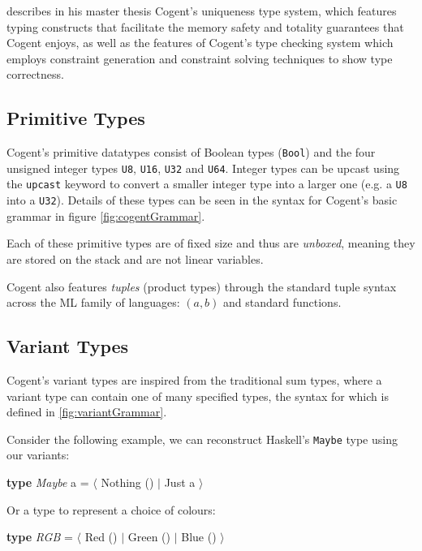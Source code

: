 \citet{LiamThesis} describes in his master thesis Cogent's uniqueness type
system, which features typing constructs that facilitate the memory safety
and totality guarantees that Cogent enjoys, as well as the features of
Cogent's type checking system which employs constraint generation
and constraint solving techniques to show type correctness.

\subsection{Primitive Types}

Cogent's primitive datatypes consist of Boolean types (\texttt{Bool}) and the four unsigned integer types \texttt{U8}, 
\texttt{U16}, \texttt{U32} and \texttt{U64}. Integer types can be upcast using the \texttt{\textsf{upcast}}
keyword to convert a smaller integer type into a larger one (e.g. a \texttt{U8} into a \texttt{U32}).
Details of these types can be seen in the syntax for Cogent's basic grammar in figure \ref{fig:cogentGrammar}.

Each of these primitive types are of fixed size and thus are \emph{unboxed}, meaning they are stored on the
stack and are not linear variables.

Cogent also features \emph{tuples} (product types) through the standard tuple syntax across the ML
family of languages: $(a,b)$ and standard functions.

\subsection{Variant Types}

Cogent's variant types are inspired from the traditional sum types, where a variant type can contain
one of many specified types, the syntax for which is defined in \autoref{fig:variantGrammar}.

Consider the following example, we can reconstruct Haskell's \texttt{Maybe} type using our variants:

\begin{center}
    \textbf{type} \textit{Maybe} a = $\langle$ Nothing () $\vert$ Just a $\rangle$
\end{center}

Or a type to represent a choice of colours:

\begin{center}
    \textbf{type} \textit{RGB} = $\langle$ Red () $\vert$ Green () $\vert$ Blue () $\rangle$
\end{center}

